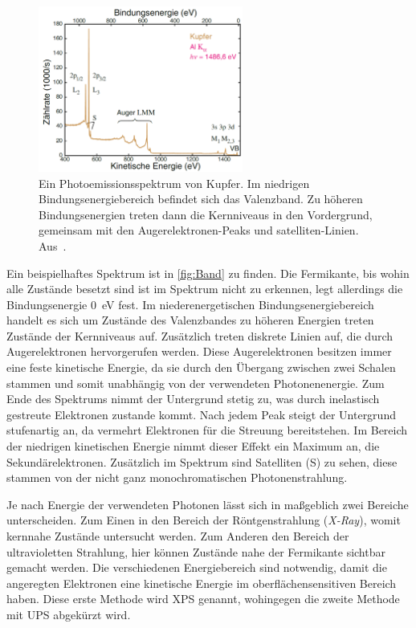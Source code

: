         \begin{figure}
            \centering
            \includegraphics[width=0.6\textwidth]{Band}
            \caption{Ein Photoemissionsspektrum von Kupfer.
            Im niedrigen Bindungsenergiebereich befindet sich das Valenzband. 
            Zu höheren Bindungsenergien treten dann die Kernniveaus in den Vordergrund, gemeinsam mit den Augerelektronen-Peaks und satelliten-Linien.
            Aus~\cite{Fauster}.}
            \label{fig:Band}
        \end{figure}
        Ein beispielhaftes Spektrum ist in \autoref{fig:Band} zu finden.
        Die Fermikante, bis wohin alle Zustände besetzt sind ist im Spektrum nicht zu erkennen, legt allerdings die Bindungsenergie \SI{0}{\electronvolt} fest.
        Im niederenergetischen Bindungsenergiebereich handelt es sich um Zustände des Valenzbandes zu höheren Energien treten Zustände der Kernniveaus auf.
        Zusätzlich treten diskrete Linien auf, die durch Augerelektronen hervorgerufen werden.
        Diese Augerelektronen besitzen immer eine feste kinetische Energie, da sie durch den Übergang zwischen zwei Schalen stammen und somit unabhängig von der verwendeten Photonenenergie.
        Zum Ende des Spektrums nimmt der Untergrund stetig zu, was durch inelastisch gestreute Elektronen zustande kommt.
        Nach jedem Peak steigt der Untergrund stufenartig an, da vermehrt Elektronen für die Streuung bereitstehen.
        Im Bereich der niedrigen kinetischen Energie nimmt dieser Effekt ein Maximum an, die Sekundärelektronen.
        Zusätzlich im Spektrum sind Satelliten (S) zu sehen, diese stammen von der nicht ganz monochromatischen Photonenstrahlung. %

        Je nach Energie der verwendeten Photonen lässt sich in maßgeblich zwei Bereiche unterscheiden.
        Zum Einen in den Bereich der Röntgenstrahlung (\textit{X-Ray}), womit kernnahe Zustände untersucht werden.
        Zum Anderen den Bereich der ultravioletten Strahlung, hier können Zustände nahe der Fermikante sichtbar gemacht werden.
        Die verschiedenen Energiebereich sind notwendig, damit die angeregten Elektronen eine kinetische Energie im oberflächensensitiven Bereich haben.
        Diese erste Methode wird XPS genannt, wohingegen die zweite Methode mit UPS abgekürzt wird.


